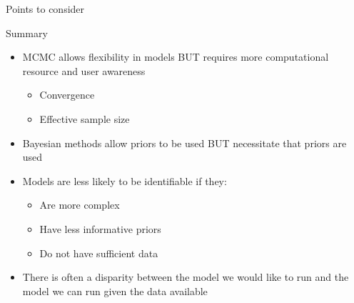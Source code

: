 \documentclass[
  ignorenonframetext,
  aspectratio=169,
]{beamer}
\providecommand{\tightlist}{%
  \setlength{\itemsep}{0pt}\setlength{\parskip}{0pt}}
\begin{document}
\begin{frame}[fragile]{Points to consider}
\begin{comment}
  - The posteriors are the same - these are the same model just formulated differently!
  - The dcat and dbern versions take longer to run due to the loop
  - The dcat and dbern versions would allow us to fit individual-level predictors to prevalence
  - The advantage of dcat and dmulti is that we are not stuck with binary outcomes, i.e. we can have 3, 4, 5, etc different possible outcomes

You should also note that the dbern version has a higher effective sample size. The reason for this is that JAGS can use a conjugate sampler in this case; this outside the scope of this course but you can read up on what this means [here](https://en.wikipedia.org/wiki/Conjugate_prior))

If you are really interested in what kind of sampler JAGS is using for each parameter, you can always find out:

\scriptsize

```r
extract(dbern_results, "samplers")
##   Index.No             Sampler       Node
## 1        1 bugs::ConjugateBeta prevalence
extract(dcat_results, "samplers")
##   Index.No          Sampler                      Node
## 1        1 base::RealSlicer observed_probabilities[2]
extract(dmulti_results, "samplers")
##   Index.No          Sampler                      Node
## 1        1 base::RealSlicer observed_probabilities[2]
```

\normalsize

But the internal mechanisms of JAGS is well outside the scope of this course!

\end{comment}
\end{frame}

\begin{frame}[fragile]{Summary}
\protect\hypertarget{summary}{}
\begin{itemize}
\item
  MCMC allows flexibility in models BUT requires more computational
  resource and user awareness

  \begin{itemize}
  \tightlist
  \item
    Convergence
  \item
    Effective sample size
  \end{itemize}
\item
  Bayesian methods allow priors to be used BUT necessitate that priors
  are used
\item
  Models are less likely to be identifiable if they:

  \begin{itemize}
  \tightlist
  \item
    Are more complex
  \item
    Have less informative priors
  \item
    Do not have sufficient data
  \end{itemize}
\item
  There is often a disparity between the model we would like to run and
  the model we can run given the data available
\end{itemize}
\end{frame}
\end{document}
